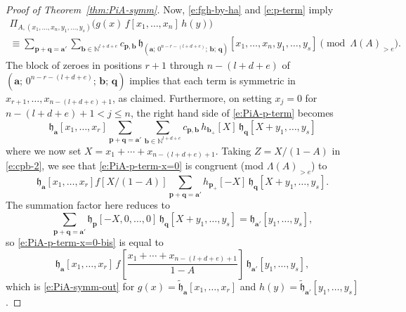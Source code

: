 \documentclass[10pt,a4paper]{amsart}
\newcommand{\NN}{{\mathbb N}}
\newcommand{\aA}{{\mathbf a}}
\newcommand{\bb}{{\mathbf b}}
\newcommand{\fh}{{\mathfrak h}}
\newcommand{\pp}{{\mathbf p}}
\newcommand{\qq}{{\mathbf q}}
\newcommand{\tfh}{{\widetilde{\mathfrak h}}}
\begin{document}
\begin{proof}[Proof of Theorem~\ref{thm:PiA-symm}]
Now, \eqref{e:fgh-by-ha} and \eqref{e:p-term} imply
\begin{multline}\label{e:PiA-p-term}
\Pi _{A,(x_{1},\ldots,x_{n},y_{1},\ldots,y_{s})}
\bigl( g(x)\, f[x_{1},\ldots,x_{n}]\, h(y) \bigr)\\
\equiv \sum _{\pp +\qq =\aA '}\sum _{\bb \in \NN ^{l+d+e}} c_{\pp ,\bb
}\, \fh_{(\aA ;\, 0^{n-r-(l+d+e)};\, \bb ;\, \qq )} [x_{1}, \ldots,
x_{n}, y_{1}, \ldots, y_{s}] \pmod{\Lambda (A)_{>e}}.
\end{multline}
The block of zeroes in positions $r+1$ through $n-(l+d+e)$ of $(\aA
;\, 0^{n-r-(l+d+e)};\, \bb ;\, \qq )$ implies that each term is
symmetric in $x_{r+1},\ldots,x_{n-(l+d+e)+1}$, as claimed.
Furthermore, on setting $x_{j} = 0$ for $n-(l+d+e)+1 < j \leq n$, the
right hand side of \eqref{e:PiA-p-term} becomes
\begin{equation}\label{e:PiA-p-term-x=0}
\fh_{\aA }[x_{1},\ldots,x_{r}] \sum _{\pp +\qq =\aA '}\sum _{\bb \in \NN
^{l+d+e}} c_{\pp ,\bb }\, h_{\bb_+}[X]\, \fh_{\qq } [X + y_{1}, \ldots,
y_{s}]
\end{equation}
where we now set $X = x_{1}+\cdots +x_{n-(l+d+e)+1}$.  Taking $Z =
X/(1-A)$ in \eqref{e:cpb-2}, we see that \eqref{e:PiA-p-term-x=0} is
congruent (mod $\Lambda (A)_{>e}$) to
\begin{equation}\label{e:PiA-p-term-x=0-bis}
\fh_{\aA }[x_{1},\ldots,x_{r}] f[X/(1-A)] \sum _{\pp +\qq =\aA '} h_{\pp
_{+}}[-X]\, \fh_{\qq } [X + y_{1}, \ldots, y_{s}].
\end{equation}
The summation factor here reduces to
\begin{equation}\label{e:PiA-p-term-x=0-ter}
 \sum _{\pp +\qq =\aA '} \fh_{\pp }[-X,0,\ldots,0]\, \fh _{\qq } [X +
y_{1}, \ldots, y_{s}] = \fh_{\aA '}[y_{1},\ldots,y_{s}],
\end{equation}
so \eqref{e:PiA-p-term-x=0-bis} is equal to
\begin{equation}\label{e:PiA-p-term-x=0-iv}
\fh_{\aA }[x_{1},\ldots,x_{r}] \, f \! \left[\frac{x_{1}+\cdots
+x_{n-(l+d+e)+1}}{1-A} \right] \, \fh_{\aA '}[y_{1},\ldots,y_{s}],
\end{equation}
which is \eqref{e:PiA-symm-out} for $g(x) = \tfh_{\aA
}[x_{1},\ldots,x_{r}]$ and $h(y) = \tfh _{\aA
'}[y_{1},\ldots,y_{s}]$.
\end{proof}
\end{document}
